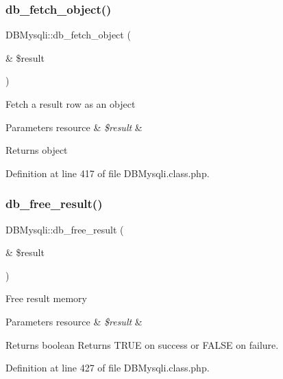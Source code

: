 \subsubsection{\texorpdfstring{db\+\_\+fetch\+\_\+object()}{db\_fetch\_object()}}
{\footnotesize\ttfamily D\+B\+Mysqli\+::db\+\_\+fetch\+\_\+object (\begin{DoxyParamCaption}\item[{\&}]{\$result }\end{DoxyParamCaption})}

Fetch a result row as an object 
\begin{DoxyParams}[1]{Parameters}
resource & {\em \$result} & \\
\hline
\end{DoxyParams}
\begin{DoxyReturn}{Returns}
object 
\end{DoxyReturn}


Definition at line 417 of file D\+B\+Mysqli.\+class.\+php.

\mbox{\label{classDBMysqli_a8639ebaca8bae119797a084af68750cc}} 
\subsubsection{\texorpdfstring{db\+\_\+free\+\_\+result()}{db\_free\_result()}}
{\footnotesize\ttfamily D\+B\+Mysqli\+::db\+\_\+free\+\_\+result (\begin{DoxyParamCaption}\item[{\&}]{\$result }\end{DoxyParamCaption})}

Free result memory 
\begin{DoxyParams}[1]{Parameters}
resource & {\em \$result} & \\
\hline
\end{DoxyParams}
\begin{DoxyReturn}{Returns}
boolean Returns T\+R\+UE on success or F\+A\+L\+SE on failure. 
\end{DoxyReturn}


Definition at line 427 of file D\+B\+Mysqli.\+class.\+php.

\mbox{\label{classDBMysqli_a080939c13758f00ecd0092eda6cd2452}} 
